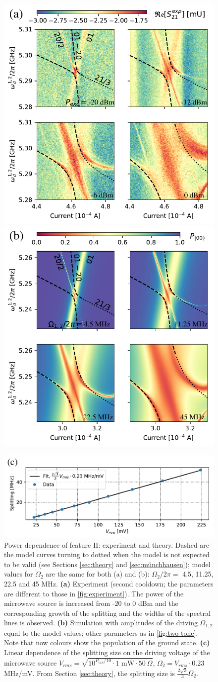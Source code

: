 \documentclass[%
 pra,
 amsmath,amssymb,
 reprint,%
]{revtex4-1}
\begin{document}
\begin{figure}
	\includegraphics[width=.49\linewidth]{powerscan}
	\includegraphics[width=.49\linewidth]{zoom2_picture}
	
	\includegraphics[width=.7\linewidth]{powerscan_1d}
	\caption{Power dependence of feature II: experiment and theory. Dashed are the model curves turning to dotted when the model is not expected to be valid (see Sections \ref{sec:theory} and \ref{sec:münchhausen}); model values for $\Omega_2$ are the same for both (a) and (b): $\Omega_{2}/2\pi=$ 4.5, 11.25, 22.5 and 45 MHz. \textbf{(a)} Experiment (second cooldown; the parameters are different to those in \autoref{fig:experiment}). The power of the microwave source is increased from -20 to 0 dBm and the corresponding growth of the splitting and the widths of the spectral lines is observed. \textbf{(b)} Simulation with amplitudes of the driving $\Omega_{1,2}$ equal to the model values; other parameters as in \autoref{fig:two-tone}. Note that now colours show the population of the ground state. \textbf{(c)} Linear dependence of the splitting size on the driving voltage of the microwave source $V_{rms} = \sqrt{10^{P_{exc}/10}\cdot 1 \text{ mW} \cdot 50\ \Omega}$, $\Omega_2 = V_{rms}\cdot 0.23$ MHz/mV. From Section \ref{sec:theory}, the splitting size is $\frac{2\sqrt{3}}{3} \Omega_2$.}
	\label{fig:zoom}
\end{figure}
\end{document}
